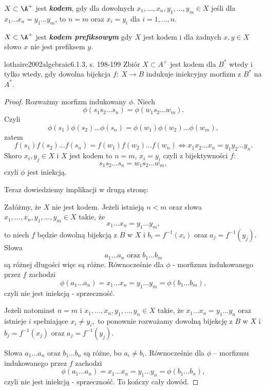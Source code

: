 \begin{definition}{}{}
  $X \subset \A^+$ jest \textbf{\textit{kodem}}, gdy dla dowolnych $x_1, \ldots, x_n, y_1, \ldots, y_m \in X$ jeśli dla $x_1 \ldots x_n = y_1 \ldots y_m$, to $n = m$ oraz $x_i = y_i$ dla $i = 1, \ldots, n$.
\end{definition}

\begin{definition}{}{}
  $X \subset \A^+$ jest \textbf{\textit{kodem prefiksowym}} gdy $X$ jest kodem i dla żadnych $x, y \in X$ słowo $x$ nie jest prefiksem $y$.
\end{definition}

\begin{problem}{lothaire2002algebraic}{6.1.3, s. 198-199}
  Zbiór $X \subset A^{+}$ jest kodem dla $B^{*}$ wtedy i tylko wtedy, gdy dowolna bijekcja $f:\ X \rightarrow B$ indukuje iniekcyjny morfizm z $B^{*}$ na $A^{*}$.
\end{problem}

\begin{proof}
Rozważmy morfizm indukowany $\phi$. Niech
$$\phi(s_1s_2\dots s_n) = \phi(w_1s_2\dots w_m).$$ 
Czyli
$$\phi(s_1)\phi(s_2)\dots \phi(s_n) = \phi(w_1)\phi(w_2)\dots \phi(w_m),$$
zatem
$$f(s_1)f(s_2)\dots f(s_n) =  f(w_1)f(w_2)\dots f(w_n) \Leftrightarrow x_1 x_2\dots x_n = y_1 y_2 \dots y_n.$$
Skoro $x_i, y_j \in X$ i $X$ jest kodem to $n = m$, $x_i = y_i$ czyli z bijektywności $f$:
$$s_1s_2\dots s_n = w_1s_2\dots w_m,$$
czyli $\phi$ jest iniekcją.

Teraz dowiedziemy implikacji w drugą stronę:

Załóżmy, że $X$ nie jest kodem. Jeżeli istnieją $n < m$ oraz słowa $x_1, \dots, x_n, y_1, \dots, y_m \in X$ takie, że 
$$x_1 \dots x_n = y_1 \dots y_m,$$ 
to niech $f$ będzie dowolną bijekcją z $B$ w $X$ i $b_i = f^{-1}(x_i)$ oraz $a_j = f^{-1}(y_j)$. Słowa
$$a_1 \dots a_n \text{ oraz } b_1 \dots b_m$$
są różnej długości więc są różne. Równocześnie dla $\phi$ - morfizmu indukowanego przez $f$ zachodzi
$$\phi(a_1 \dots a_n) = x_1 \dots x_n = y_1 \dots y_m = \phi(b_1 \dots b_m),$$
czyli nie jest iniekcją - sprzeczność.

Jeżeli natomiast $n=m$ i $x_1, \dots, x_n, y_1, \dots, y_n \in X$ takie, że
$x_1 \dots x_n = y_1 \dots y_n$
oraz istnieje $i$ spełniające 
$x_i \neq y_i,$
to ponownie rozważamy dowolną bijekcję z $B$ w $X$ i $b_j = f^{-1}(x_j)$ oraz $a_j = f^{-1}(y_j)$.

Słowa
$a_1 \dots a_n \text{ oraz } b_1 \dots b_n$
są różne, bo $a_i \neq b_i$. Równocześnie dla $\phi$ -- morfizmu indukowanego przez $f$ zachodzi
$$\phi(a_1 \dots a_n) = x_1 \dots x_n = y_1 \dots y_n = \phi(b_1 \dots b_n),$$
czyli nie jest iniekcją - sprzeczność.
To kończy cały dowód.
\end{proof}
